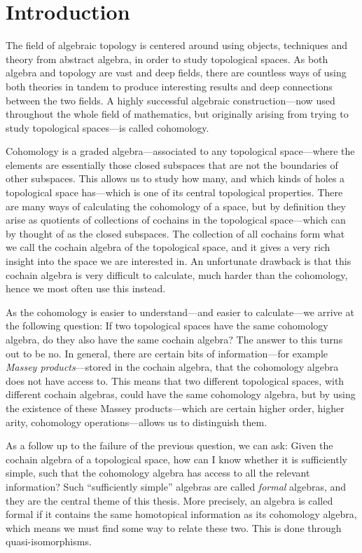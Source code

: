 
\section{Introduction}

The field of algebraic topology is centered around using objects, techniques and theory from abstract algebra, in order to study topological spaces. As both algebra and topology are vast and deep fields, there are countless ways of using both theories in tandem to produce interesting results and deep connections between the two fields. A highly successful algebraic construction---now used throughout the whole field of mathematics, but originally arising from trying to study topological spaces---is called cohomology. 

Cohomology is a graded algebra---associated to any topological space---where the elements are essentially those closed subspaces that are not the boundaries of other subspaces. This allows us to study how many, and which kinds of holes a topological space has---which is one of its central topological properties. There are many ways of calculating the cohomology of a space, but by definition they arise as quotients of collections of cochains in the topological space---which can by thought of as the closed subspaces. The collection of all cochains form what we call the cochain algebra of the topological space, and it gives a very rich insight into the space we are interested in. An unfortunate drawback is that this cochain algebra is very difficult to calculate, much harder than the cohomology, hence we most often use this instead.

As the cohomology is easier to understand---and easier to calculate---we arrive at the following question: If two topological spaces have the same cohomology algebra, do they also have the same cochain algebra? The answer to this turns out to be no. In general, there are certain bits of information---for example \emph{Massey products}---stored in the cochain algebra, that the cohomology algebra does not have access to. This means that two different topological spaces, with different cochain algebras, could have the same cohomology algebra, but by using the existence of these Massey products---which are certain higher order, higher arity, cohomology operations---allows us to distinguish them. 

As a follow up to the failure of the previous question, we can ask: Given the cochain algebra of a topological space, how can I know whether it is sufficiently simple, such that the cohomology algebra has access to all the relevant information? Such ``sufficiently simple'' algebras are called \emph{formal} algebras, and they are the central theme of this thesis. More precisely, an algebra is called formal if it contains the same homotopical information as its cohomology algebra, which means we must find some way to relate these two. This is done through quasi-isomorphisms. 


